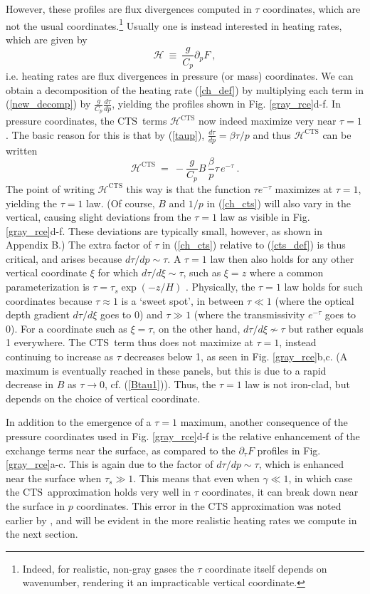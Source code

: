 \documentclass{ametsoc}
\newcommand{\beqn}{\begin{equation}}
\newcommand{\eeqn}{\end{equation}}
\newcommand{\eqnref}[1]{(\ref{#1})}
\newcommand{\der}[2]{\ensuremath{\frac{d #1}{d #2}}}
\newcommand{\ppp}{\ensuremath{\partial_p}}
\newcommand{\pptau}{\ensuremath{\partial_\tau}}
\newcommand{\Cp}{\ensuremath{C_p}}
\newcommand{\ch}{\ensuremath{\mathcal{H}}}
\newcommand{\taus}{\ensuremath{\tau_s}}
\newcommand{\CTS}{\ensuremath{\mathrm{CTS}}}
\begin{document}
However, these profiles are flux divergences computed in $\tau$ coordinates, which are not the usual coordinates.\footnote{Indeed, for realistic, non-gray gases the $\tau$ coordinate itself depends on wavenumber, rendering it an impracticable vertical coordinate.} Usually one is instead interested in heating rates, which are given by
\beqn
	\ch \ \equiv \ \frac{g}{\Cp}  \ppp F \ ,
	\label{ch_def}
\eeqn 
i.e. heating rates are flux divergences in pressure (or mass) coordinates. We can obtain a decomposition of the heating rate \eqnref{ch_def} by multiplying each term in \eqnref{new_decomp} by $\frac{g}{\Cp}\der{\tau}{p}$, yielding the profiles shown in Fig. \ref{gray_rce}d-f. In pressure coordinates, the \CTS\ terms $\ch^{\CTS}$ now indeed maximize very near $\tau=1$. The basic reason for this is that by \eqnref{taup}, $\der{\tau}{p} = \beta \tau/p$ and thus $\ch^{\CTS}$ can be written
\beqn
	\ch^{\CTS} \ = \ -\frac{g}{\Cp}B\, \frac{\beta}{p}\tau\, e^{-\tau} \ .
	\label{ch_cts}
\eeqn
The point of writing $\ch^{\CTS}$ this way is that  the function $\tau e^{-\tau}$ maximizes at $\tau=1$, yielding the $\tau=1$ law. (Of course, $B$ and $1/p$ in \eqnref{ch_cts} will also vary in the vertical, causing slight deviations from the $\tau=1$ law as visible in Fig. \ref{gray_rce}d-f. These deviations are typically small, however, as shown in Appendix B.) The extra factor of $\tau$ in \eqnref{ch_cts} relative to \eqnref{cts_def} is thus critical, and arises because $d \tau/dp \sim \tau$. A $\tau=1$ law then also holds for any other vertical coordinate $\xi$ for which $d \tau/d\xi \sim \tau$, such as $\xi=z$ where a common parameterization is $\tau=\taus \exp(-z/H)$  \citep[e.g.][]{huang2014,weaver1995,held1982}.  Physically, the $\tau=1$ law holds for such coordinates because $\tau\approx 1$ is a `sweet spot', in between $\tau \ll 1$ (where the optical depth gradient $d \tau/d\xi$ goes to 0) and $\tau \gg 1$  (where the transmissivity $e^{-\tau}$ goes to 0). For a coordinate such as $\xi=\tau$, on the other hand, $d \tau/d\xi \nsim\tau$ but rather equals 1 everywhere. The \CTS\ term thus does not maximize at $\tau=1$, instead continuing to increase as $\tau$ decreases below 1, as seen in Fig. \ref{gray_rce}b,c. (A maximum is eventually reached in these panels, but this is due to a rapid decrease in $B$ as $\tau\rightarrow 0$, cf. \eqnref{Btau1}). Thus, the $\tau=1$ law is not iron-clad, but depends on the choice of vertical coordinate.

In addition to the emergence of a $\tau=1$ maximum, another consequence of the pressure coordinates used in  Fig. \ref{gray_rce}d-f is the relative enhancement of the exchange terms near the surface, as compared  to the $\pptau F$ profiles in Fig. \ref{gray_rce}a-c. This is again due to the factor of $d \tau/dp\sim \tau$, which is enhanced near the surface when $\taus \gg 1$. This means that even when $\gamma \ll1$, in which case the \CTS\ approximation holds very well in $\tau$ coordinates, it can break down near the surface in $p$ coordinates. This error in the CTS approximation was noted earlier by \cite{joseph1976}, and will be evident in the more realistic heating rates we compute in the next section.
\end{document}
